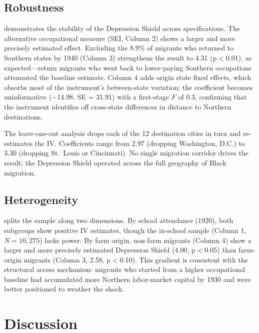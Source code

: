 \documentclass[12pt]{article}
\begin{document}
\subsection{Robustness}

 demonstrates the stability of the Depression Shield across specifications. The alternative occupational measure (SEI, Column 2) shows a larger and more precisely estimated effect. Excluding the 8.9\% of migrants who returned to Southern states by 1940 (Column 3) strengthens the result to 4.31 (p$<$0.01), as expected---return migrants who went back to lower-paying Southern occupations attenuated the baseline estimate. Column 4 adds origin state fixed effects, which absorbs most of the instrument's between-state variation; the coefficient becomes uninformative ($-$14.98, SE = 31.91) with a first-stage $F$ of 0.3, confirming that the instrument identifies off cross-state differences in distance to Northern destinations.

The leave-one-out analysis drops each of the 12 destination cities in turn and re-estimates the IV. Coefficients range from 2.97 (dropping Washington, D.C.) to 3.30 (dropping St.\ Louis or Cincinnati). No single migration corridor drives the result; the Depression Shield operated across the full geography of Black migration.



\subsection{Heterogeneity}

 splits the sample along two dimensions. By school attendance (1920), both subgroups show positive IV estimates, though the in-school sample (Column 1, $N = 10,275$) lacks power. By farm origin, non-farm migrants (Column 4) show a larger and more precisely estimated Depression Shield (4.00, p$<$0.05) than farm-origin migrants (Column 3, 2.58, p$<$0.10). This gradient is consistent with the structural access mechanism: migrants who started from a higher occupational baseline had accumulated more Northern labor-market capital by 1930 and were better positioned to weather the shock.



\section{Discussion}
\end{document}
